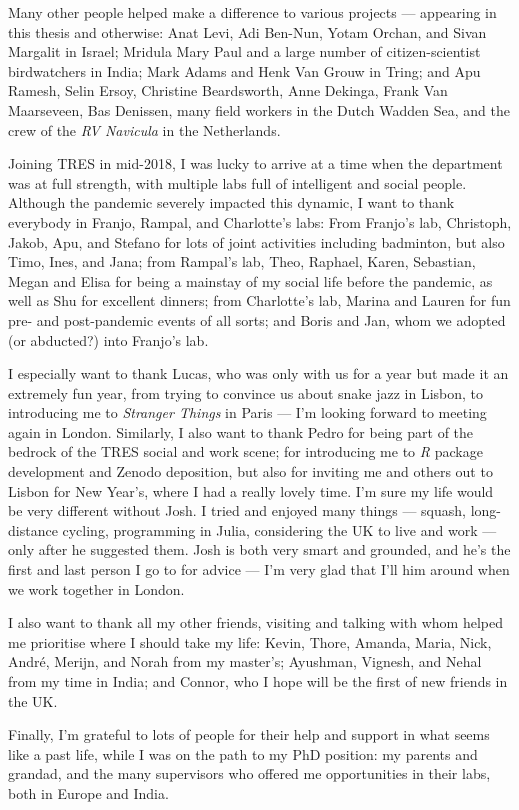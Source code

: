 Many other people helped make a difference to various projects --- appearing in this thesis and otherwise: Anat Levi, Adi Ben-Nun, Yotam Orchan, and Sivan Margalit in Israel; Mridula Mary Paul and a large number of citizen-scientist birdwatchers in India; Mark Adams and Henk Van Grouw in Tring; and Apu Ramesh, Selin Ersoy, Christine Beardsworth, Anne Dekinga, Frank Van Maarseveen, Bas Denissen, many field workers in the Dutch Wadden Sea, and the crew of the \textit{RV Navicula} in the Netherlands.

\medskip

Joining TRES in mid-2018, I was lucky to arrive at a time when the department was at full strength, with multiple labs full of intelligent and social people.
Although the pandemic severely impacted this dynamic, I want to thank everybody in Franjo, Rampal, and Charlotte's labs:
From Franjo's lab, Christoph, Jakob, Apu, and Stefano for lots of joint activities including badminton, but also Timo, Ines, and Jana;
from Rampal's lab, Theo, Raphael, Karen, Sebastian, Megan and Elisa for being a mainstay of my social life before the pandemic, as well as Shu for excellent dinners;
from Charlotte's lab, Marina and Lauren for fun pre- and post-pandemic events of all sorts;
and Boris and Jan, whom we adopted (or abducted?) into Franjo's lab.

I especially want to thank Lucas, who was only with us for a year but made it an extremely fun year, from trying to convince us about snake jazz in Lisbon, to introducing me to \textit{Stranger Things} in Paris --- I'm looking forward to meeting again in London.
Similarly, I also want to thank Pedro for being part of the bedrock of the TRES social and work scene; for introducing me to \textit{R} package development and Zenodo deposition, but also for inviting me and others out to Lisbon for New Year's, where I had a really lovely time.
I'm sure my life would be very different without Josh.
I tried and enjoyed many things --- squash, long-distance cycling, programming in Julia, considering the UK to live and work --- only after he suggested them.
Josh is both very smart and grounded, and he's the first and last person I go to for advice --- I'm very glad that I'll him around when we work together in London.

I also want to thank all my other friends, visiting and talking with whom helped me prioritise where I should take my life: Kevin, Thore, Amanda, Maria, Nick, Andr{\'e}, Merijn, and Norah from my master's; Ayushman, Vignesh, and Nehal from my time in India; and Connor, who I hope will be the first of new friends in the UK.

Finally, I'm grateful to lots of people for their help and support in what seems like a past life, while I was on the path to my PhD position: my parents and grandad, and the many supervisors who offered me opportunities in their labs, both in Europe and India.

{ \begin{center}  \end{center} }

\endgroup
